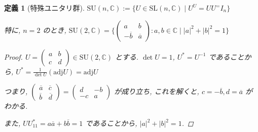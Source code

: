 \documentclass[xelatex,a4paper,ja=standard]{bxjsreport}
\newtheorem{definition}{定義}%
\begin{document}
\begin{definition}[特殊ユニタリ群]
    \(\mathrm{SU}(n, \mathbb{C}) := \{U \in \mathrm{SL}(n, \mathbb{C}) \mid U^ U = U U^ = I_n\}\) \par
    特に, \(n = 2\) のとき, \(\mathrm{SU}(2, \mathbb{C}) = \{\begin{pmatrix} a & b \\ -\overline{b} & \overline{a} \end{pmatrix}
    : a, b \in \mathbb{C} \mid |a|^2 + |b|^2 = 1\}\)

    \begin{proof}
        \(U = \begin{pmatrix} a & b \\ c & d \end{pmatrix} \in \mathrm{SU}(2, \mathbb{C})\) とする.
        \(\det U = 1\), \(U^* = U^{-1}\) であることから,
        \(U^* = \frac{1}{\det U}(\mathrm{adj}U) = \mathrm{adj}U\)

        つまり, \(\begin{pmatrix} \overline{a} & \overline{c} \\ \overline{b} & \overline{d} \end{pmatrix}
        = \begin{pmatrix} d & -b \\ -c & a \end{pmatrix}\)
        が成り立ち, これを解くと, \(c = -\overline{b}, d = \overline{a}\) がわかる.

        また, \(UU^*_{1 1} = a\overline{a} + b\overline{b} = 1\) であることから, 
        \(|a|^2 + |b|^2 = 1\).
    \end{proof}
\end{definition}
\end{document}
